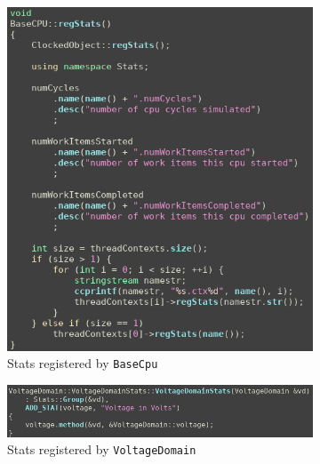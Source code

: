 \begin{figure}[H]
    \centering
    \begin{subfigure}[b]{0.45\textwidth}
        \centering
        \includegraphics[width=\textwidth]{screenshots/have-to-search-src-for-regStats/base-cpu-cc-regStats.png}
        \caption{Stats registered by \texttt{BaseCpu}}
    \end{subfigure}
    \hfil
    \begin{minipage}[b]{0.45\textwidth}
        \begin{subfigure}[b]{\linewidth}
            \centering
            \includegraphics[width=\textwidth]{screenshots/have-to-search-src-for-regStats/voltage-domain-registers-a-stat.png}
            \caption{Stats registered by \texttt{VoltageDomain}}
        \end{subfigure}
        \\[\baselineskip]
        \begin{subfigure}[b]{\linewidth}

\end{subfigure}
\end{minipage}
\end{figure}
